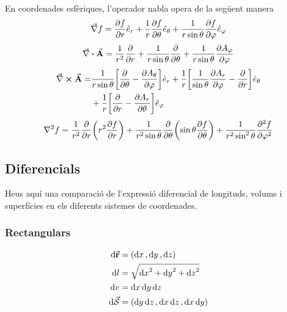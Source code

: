 \begin{defi}
	En coordenades esfèriques, l'operador nabla opera de la següent manera
	\begin{align}
		\vec{\nabla} f = \pdv{f}{r} \hat{e}_{r} + \frac{1}{r}\pdv{f}{\theta} \hat{e}_{\theta} + \frac{1}{r \sin \theta}\pdv{f}{\varphi} \hat{e}_{\varphi}
	\end{align}
	\begin{align}
		\div{A} = \frac{1}{r^{2}} \pdv{}{r} (r^{2} A_{r}) + \frac{1}{r \sin \theta}\pdv{}{\theta} (A_{\theta} \sin \theta) + \frac{1}{r \sin \theta}\pdv{A_{\varphi}}{\varphi}
	\end{align}
	\begin{align}
		\begin{aligned}
			\rot{A} = & \frac{1}{r \sin \theta} \qty[ \pdv{}{\theta} (A_{\varphi} \sin \theta) - \pdv{A_{\theta}}{\varphi} ] \hat{e}_{r} + \frac{1}{r} \qty[ \frac{1}{\sin \theta} \pdv{A_{r}}{\varphi} - \pdv{}{r} (r A_{\varphi}) ] \hat{e}_{\theta} \\
			&+ \frac{1}{r} \qty[ \pdv{}{r} (r A_{\theta}) - \pdv{A_{r}}{\theta} ] \hat{e}_{\varphi}
		\end{aligned}
	\end{align}
	\begin{align}
		\nabla^{2} f = \frac{1}{r^{2}} \pdv{}{r} \qty( r^{2} \pdv{f}{r} ) + \frac{1}{r^{2} \sin \theta} \pdv{}{\theta} \qty(\sin \theta \pdv{f}{\theta} ) + \frac{1}{r^{2} \sin^{2} \theta}\pdv[2]{f}{\varphi}
	\end{align}
\end{defi}

\subsection{Diferencials}
Heus aquí una comparació de l'expressió diferencial de longituds, volums i superfícies en els diferents sistemes de coordenades.
\subsubsection*{Rectangulars}
\begin{align*}
	\begin{aligned}
		\dd{\va{r}} &= (\dd{x}, \dd{y}, \dd{z}) \\
		\dd{l} &= \sqrt{\dd{x}^{2} + \dd{y}^{2} + \dd{z}^{2}} \\
		\dd{v} &= \dd{x} \dd{y} \dd{z} \\
		\dd{\va{\mathcal{S}}} &= (\dd{y} \dd{z}, \dd{x} \dd{z}, \dd{x} \dd{y})
	\end{aligned}
\end{align*}

